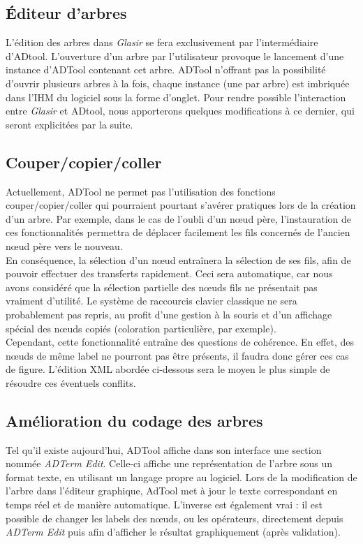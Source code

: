 	\subsection{Éditeur d'arbres}

	L'édition des arbres dans \emph{Glasir} se fera exclusivement par l'intermédiaire d'ADtool. L'ouverture d'un arbre par l'utilisateur provoque le lancement d'une instance d'ADTool contenant cet arbre. ADTool n'offrant pas la possibilité d'ouvrir plusieurs arbres à la fois, chaque instance (une par arbre) est imbriquée dans l'IHM du logiciel sous la forme d'onglet. Pour rendre possible l'interaction entre \emph{Glasir} et ADtool, nous apporterons quelques modifications à ce dernier, qui seront explicitées par la suite.

\subsection{Couper/copier/coller}
	
	Actuellement, ADTool ne permet pas l'utilisation des fonctions couper/copier/coller qui pourraient pourtant s'avérer pratiques lors de la création d'un arbre. Par exemple, dans le cas de l'oubli d'un nœud père, l'instauration de ces fonctionnalités permettra de déplacer facilement les fils concernés de l'ancien nœud père vers le nouveau.\\
	En conséquence, la sélection d'un nœud entraînera la sélection de ses fils, afin de pouvoir effectuer des transferts rapidement. Ceci sera automatique, car nous avons considéré que la sélection partielle des nœuds fils ne présentait pas vraiment d'utilité. Le système de raccourcis clavier classique ne sera probablement pas repris, au profit d'une gestion à la souris et d'un affichage spécial des nœuds copiés (coloration particulière, par exemple).\\

	Cependant, cette fonctionnalité entraîne des questions de cohérence. En effet, des nœuds de même label ne pourront pas être présents, il faudra donc gérer ces cas de figure. L'édition XML abordée ci-dessous sera le moyen le plus simple de résoudre ces éventuels conflits.

	\subsection{Amélioration du codage des arbres}

	Tel qu'il existe aujourd'hui, ADTool affiche dans son interface une section nommée \emph{ADTerm Edit}. Celle-ci affiche une représentation de l'arbre sous un format texte, en utilisant un langage propre au logiciel. Lors de la modification de l'arbre dans l'éditeur graphique, AdTool met à jour le texte correspondant en temps réel et de manière automatique. L'inverse est également vrai : il est possible de changer les labels des nœuds, ou les opérateurs, directement depuis \emph{ADTerm Edit} puis afin d'afficher le résultat graphiquement (après validation).\\ 

